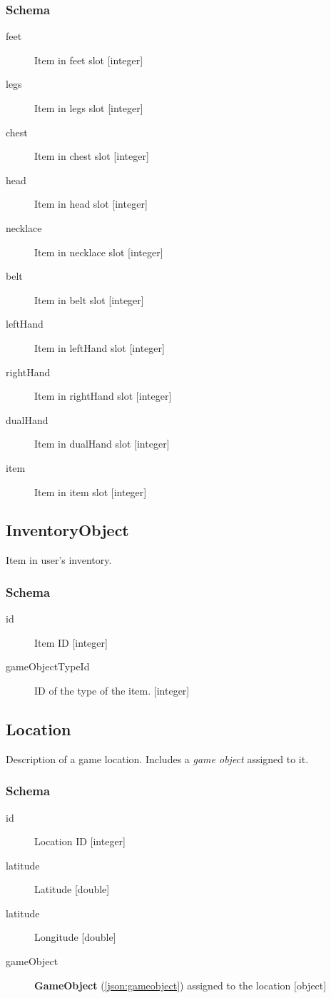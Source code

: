 		\subsubsection{Schema}
			\begin{description}
				\item[feet] Item in feet slot [integer]
				\item[legs] Item in legs slot [integer]
				\item[chest] Item in chest slot [integer]
				\item[head] Item in head slot [integer]
				\item[necklace] Item in necklace slot [integer]
				\item[belt] Item in belt slot [integer]
				\item[leftHand] Item in leftHand slot [integer]
				\item[rightHand] Item in rightHand slot [integer]
				\item[dualHand] Item in dualHand slot [integer]
				\item[item] Item in item slot [integer]			
			\end{description}

	\subsection{InventoryObject}
		\label{json:inventoryobject}	
		Item in user's inventory.
		\subsubsection{Schema}
			\begin{description}
				\item[id] Item ID [integer]
				\item[gameObjectTypeId] ID of the type of the item.	[integer]		
			\end{description}

	\subsection{Location}
		\label{json:location}	
		Description of a game location. Includes a \textit{game object} assigned to it.
		\subsubsection{Schema}
			\begin{description}
				\item[id] Location ID [integer]
				\item[latitude] Latitude [double]
				\item[latitude] Longitude [double]
				\item[gameObject] \textbf{GameObject} (\ref{json:gameobject}) assigned to the location [object]
			\end{description}	

